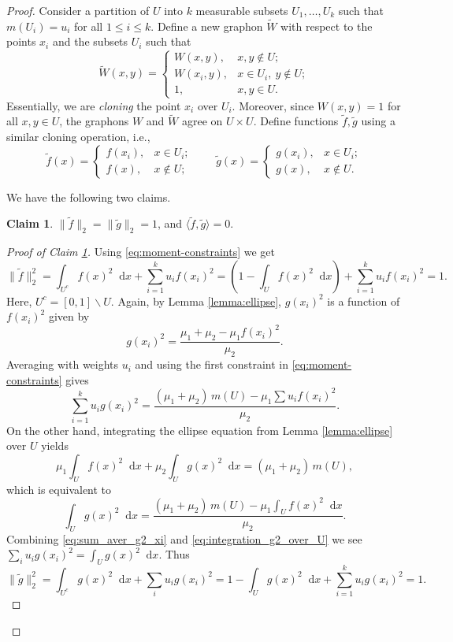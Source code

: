 \documentclass[11pt]{article}
\theoremstyle{plain}
\theoremstyle{definition}
\newtheorem{claim}{Claim}[section]
\numberwithin{equation}{section}
\newcommand{\dif}{\mathop{}\!\mathrm{d}}
\begin{document}
\begin{proof} 
Consider a partition of $U$ into $k$ measurable subsets $U_1, \ldots, U_k$ 
such that $m(U_i) = u_i$ for all $1\le i\le k$. Define a new graphon $\widetilde{W}$ with 
respect to the points $x_i$ and the subsets $U_i$ such that
\[
\widetilde{W}(x,y)=
\begin{cases}
W(x,y), & x,y\notin U;\\
W(x_i,y), & x\in U_i,\ y\notin U; \\
1, & x,y\in U.
\end{cases}
\]
Essentially, we are \emph{cloning} the point $x_i$ over $U_i$. Moreover, since $W(x,y)=1$ 
for all $x,y\in U$, the graphons $W$ and $\widetilde{W}$ agree on $U\times U$. 
Define functions $\tilde{f},\tilde{g}$ using a similar cloning operation, i.e.,  
\begin{equation}\label{eq:tilde-def}
\tilde f(x)=
\begin{cases}
f(x_i), & x\in U_i;\\
f(x), & x\notin U;
\end{cases}
\qquad
\tilde g(x)=
\begin{cases}
g(x_i), & x\in U_i;\\
g(x), & x\notin U.
\end{cases}
\end{equation}

We have the following two claims.

\begin{claim}\label{claim:norm_tilde_f_g}
$\|\tilde{f}\|_2 = \|\tilde{g}\|_2 = 1$, and $\langle \tilde f,\tilde g\rangle = 0$. 
\end{claim}

\begin{proof}[Proof of Claim \ref{claim:norm_tilde_f_g}]
Using \eqref{eq:moment-constraints} we get 
\[
\|\tilde f\|_2^2
= \int_{U^c} f(x)^2 \dif{x} + \sum_{i=1}^k u_i f(x_i)^2
= \left(1-\int_U f(x)^2 \dif{x}\right) + \sum_{i=1}^k u_i f(x_i)^2 = 1.
\]
Here, $U^c = [0,1]\backslash U$. Again, by Lemma \ref{lemma:ellipse}, $g(x_i)^2$ 
is a function of $f(x_i)^2$ given by
\[
g(x_i)^2=\frac{\mu_1+\mu_2-\mu_1 f(x_i)^2}{\mu_2}.
\]
Averaging with weights $u_i$ and using the first constraint in \eqref{eq:moment-constraints} gives
\begin{equation}\label{eq:sum_aver_g2_xi}
\sum_{i=1}^k u_i g(x_i)^2
=\frac{(\mu_1+\mu_2)\, m(U) - \mu_1 \sum u_i f(x_i)^2}{\mu_2}.
\end{equation}
On the other hand, integrating the ellipse equation from Lemma \ref{lemma:ellipse} over $U$ yields
\[
\mu_1 \int_U f(x)^2 \dif{x} + \mu_2\int_U g(x)^2 \dif{x} = (\mu_1+\mu_2)\, m(U),
\] 
which is equivalent to
\begin{equation}\label{eq:integration_g2_over_U}
\int_U g(x)^2 \dif{x} = \frac{(\mu_1+\mu_2)\, m(U) - \mu_1\int_U f(x)^2 \dif{x}}{\mu_2}.
\end{equation}
Combining \eqref{eq:sum_aver_g2_xi} and \eqref{eq:integration_g2_over_U} we see 
$\sum_i u_i g(x_i)^2=\int_U g(x)^2 \dif{x}$. Thus
\[
\|\tilde g\|_2^2
= \int_{U^c} g(x)^2 \dif{x} + \sum_i u_i g(x_i)^2
= 1-\int_U g(x)^2 \dif{x} + \sum_{i=1}^k u_i g(x_i)^2
= 1.
\]


\end{proof}
\end{proof}
\end{document}
